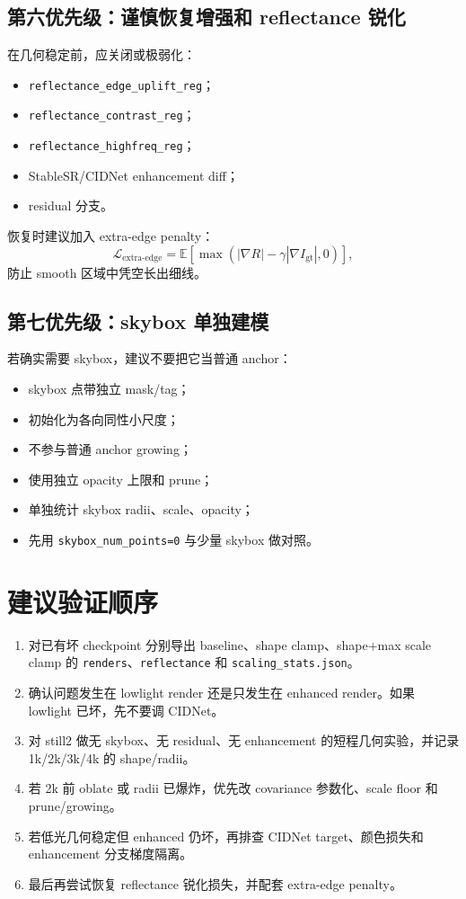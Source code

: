 \documentclass[11pt,a4paper]{article}
\begin{document}
\subsection{第六优先级：谨慎恢复增强和 reflectance 锐化}

在几何稳定前，应关闭或极弱化：
\begin{itemize}[leftmargin=1.5em]
  \item \texttt{reflectance\_edge\_uplift\_reg}；
  \item \texttt{reflectance\_contrast\_reg}；
  \item \texttt{reflectance\_highfreq\_reg}；
  \item StableSR/CIDNet enhancement diff；
  \item residual 分支。
\end{itemize}
恢复时建议加入 extra-edge penalty：
\[
  \mathcal{L}_{\text{extra-edge}}
  =
  \mathbb{E}
  \left[
    \max\left(
      |\nabla R| - \gamma |\nabla I_{\text{gt}}|,
      0
    \right)
  \right],
\]
防止 smooth 区域中凭空长出细线。

\subsection{第七优先级：skybox 单独建模}

若确实需要 skybox，建议不要把它当普通 anchor：
\begin{itemize}[leftmargin=1.5em]
  \item skybox 点带独立 mask/tag；
  \item 初始化为各向同性小尺度；
  \item 不参与普通 anchor growing；
  \item 使用独立 opacity 上限和 prune；
  \item 单独统计 skybox radii、scale、opacity；
  \item 先用 \texttt{skybox\_num\_points=0} 与少量 skybox 做对照。
\end{itemize}

\section{建议验证顺序}

\begin{enumerate}[leftmargin=1.5em]
  \item 对已有坏 checkpoint 分别导出 baseline、shape clamp、shape+max scale clamp 的 \texttt{renders}、\texttt{reflectance} 和 \texttt{scaling\_stats.json}。
  \item 确认问题发生在 lowlight render 还是只发生在 enhanced render。如果 lowlight 已坏，先不要调 CIDNet。
  \item 对 still2 做无 skybox、无 residual、无 enhancement 的短程几何实验，并记录 1k/2k/3k/4k 的 shape/radii。
  \item 若 2k 前 oblate 或 radii 已爆炸，优先改 covariance 参数化、scale floor 和 prune/growing。
  \item 若低光几何稳定但 enhanced 仍坏，再排查 CIDNet target、颜色损失和 enhancement 分支梯度隔离。
  \item 最后再尝试恢复 reflectance 锐化损失，并配套 extra-edge penalty。
\end{enumerate}
\end{document}
